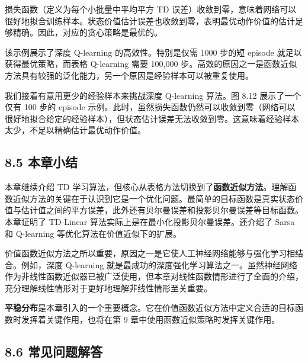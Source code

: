 \documentclass[UTF8]{article}
\begin{document}
损失函数（定义为每个小批量中平均平方 TD 误差）收敛到零，意味着网络可以很好地拟合训练样本。状态价值估计误差也收敛到零，表明最优动作价值的估计足够精确。因此，对应的贪心策略是最优的。

该示例展示了深度 Q-learning 的高效性。特别是仅需 1000 步的短 episode 就足以获得最优策略，而表格 Q-learning 需要 100,000 步。高效的原因之一是函数近似方法具有较强的泛化能力，另一个原因是经验样本可以被重复使用。

我们接着有意用更少的经验样本来挑战深度 Q-learning 算法。图 8.12 展示了一个仅有 100 步的 episode 示例。此时，虽然损失函数仍然可以收敛到零（网络可以很好地拟合给定的经验样本），但状态估计误差无法收敛到零。这意味着经验样本太少，不足以精确估计最优动作价值。

\subsection*{8.5 本章小结}

本章继续介绍 TD 学习算法，但核心从表格方法切换到了\textbf{函数近似方法}。理解函数近似方法的关键在于认识到它是一个优化问题。最简单的目标函数是真实状态价值与估计值之间的平方误差，此外还有贝尔曼误差和投影贝尔曼误差等目标函数。本章证明了 TD-Linear 算法实际上是在最小化投影贝尔曼误差。还介绍了 Sarsa 和 Q-learning 等优化算法在价值近似下的扩展。

价值函数近似方法之所以重要，原因之一是它使人工神经网络能够与强化学习相结合。例如，深度 Q-learning 就是最成功的深度强化学习算法之一。虽然神经网络作为非线性函数近似器已被广泛使用，但本章对线性函数情形进行了全面的介绍，充分理解线性情形对于更好地理解非线性情形至关重要。

\textbf{平稳分布}是本章引入的一个重要概念。它在价值函数近似方法中定义合适的目标函数时发挥着关键作用，也将在第 9 章中使用函数近似策略时发挥关键作用。

\subsection*{8.6 常见问题解答}
\end{document}
